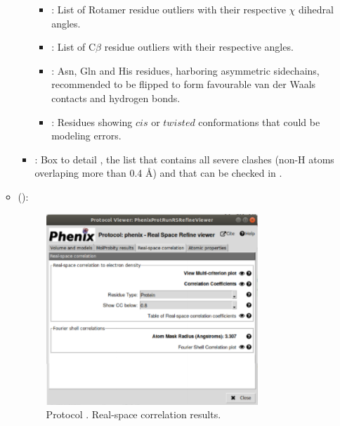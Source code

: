 \begin{itemize}
\begin{itemize}
\begin{itemize}
\begin{itemize}
          \item {}: List of Rotamer residue outliers with their respective $\chi$ dihedral angles.
          \item {}: List of C{$\beta$} residue outliers with their respective angles.
          \item {}: Asn, Gln and His residues, harboring asymmetric sidechains, recommended to be flipped to form favourable van der Waals contacts and hydrogen bonds.
          \item {}: Residues showing $cis$ or $twisted$ conformations that could be modeling errors.
         \end{itemize}

         \item {}: Box to detail , the list that contains all severe clashes (non-H atoms overlaping more than 0.4 \AA) and that can be checked in \coot.
        \end{itemize}
      \item {} ():
       \begin{figure}[H]
         \centering 
         \captionsetup{width=.7\linewidth} 
         \includegraphics[width=0.80\textwidth]{Images_appendix/Fig151.pdf}
         \caption{Protocol . Real-space correlation results.}
         \label{fig:app_protocol_real_space_refine_4}
        \end{figure}
        \begin{itemize}

\end{itemize}
\end{itemize}
\end{itemize}
